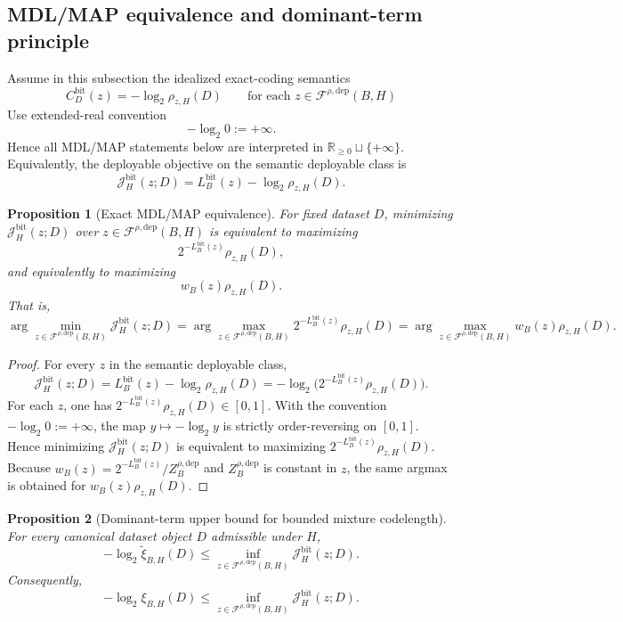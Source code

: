 \documentclass[11pt]{article}
\newtheorem{proposition}{Proposition}
\begin{document}
\subsection{MDL/MAP equivalence and dominant-term principle}

Assume in this subsection the idealized exact-coding semantics
\[
C_D^{\mathrm{bit}}(z) = -\log_2 \rho_{z,H}(D)
\qquad
\text{for each } z\in\mathcal{F}^{\rho,\mathrm{dep}}(B,H)
\]
Use extended-real convention
\[
-\log_2 0 := +\infty.
\]
Hence all MDL/MAP statements below are interpreted in
$\mathbb{R}_{\ge 0}\sqcup\{+\infty\}$.
Equivalently, the deployable objective on the semantic deployable class is
\[
\mathcal{J}_H^{\mathrm{bit}}(z;D)=L_B^{\mathrm{bit}}(z)-\log_2 \rho_{z,H}(D).
\]

\begin{proposition}[Exact MDL/MAP equivalence]
\label{prop:mdl-map}
For fixed dataset $D$, minimizing $\mathcal{J}_H^{\mathrm{bit}}(z;D)$ over
$z\in\mathcal{F}^{\rho,\mathrm{dep}}(B,H)$ is equivalent to maximizing
\[
2^{-L_B^{\mathrm{bit}}(z)}\rho_{z,H}(D),
\]
and equivalently to maximizing
\[
w_B(z)\rho_{z,H}(D).
\]
That is,
\[
\arg\min_{z\in\mathcal{F}^{\rho,\mathrm{dep}}(B,H)}\mathcal{J}_H^{\mathrm{bit}}(z;D)
=
\arg\max_{z\in\mathcal{F}^{\rho,\mathrm{dep}}(B,H)}
2^{-L_B^{\mathrm{bit}}(z)}\rho_{z,H}(D)
=
\arg\max_{z\in\mathcal{F}^{\rho,\mathrm{dep}}(B,H)}
w_B(z)\rho_{z,H}(D).
\]
\end{proposition}

\begin{proof}
For every $z$ in the semantic deployable class,
\[
\mathcal{J}_H^{\mathrm{bit}}(z;D)
=
L_B^{\mathrm{bit}}(z)-\log_2\rho_{z,H}(D)
=
-\log_2\!\bigl(2^{-L_B^{\mathrm{bit}}(z)}\rho_{z,H}(D)\bigr).
\]
For each $z$, one has
$2^{-L_B^{\mathrm{bit}}(z)}\rho_{z,H}(D)\in[0,1]$. With the convention
$-\log_2 0:=+\infty$, the map $y\mapsto -\log_2 y$ is strictly
order-reversing on $[0,1]$. Hence minimizing
$\mathcal{J}_H^{\mathrm{bit}}(z;D)$ is equivalent to maximizing
$2^{-L_B^{\mathrm{bit}}(z)}\rho_{z,H}(D)$.
Because $w_B(z)=2^{-L_B^{\mathrm{bit}}(z)}/Z_B^{\rho,\mathrm{dep}}$ and
$Z_B^{\rho,\mathrm{dep}}$ is constant in $z$, the same argmax is obtained for
$w_B(z)\rho_{z,H}(D)$.
\end{proof}

\begin{proposition}[Dominant-term upper bound for bounded mixture codelength]
\label{prop:dominant-term}
For every canonical dataset object $D$ admissible under $H$,
\[
-\log_2 \widetilde{\xi}_{B,H}(D)
\le
\inf_{z\in\mathcal{F}^{\rho,\mathrm{dep}}(B,H)} \mathcal{J}_H^{\mathrm{bit}}(z;D).
\]
Consequently,
\[
-\log_2 \xi_{B,H}(D)
\le
\inf_{z\in\mathcal{F}^{\rho,\mathrm{dep}}(B,H)} \mathcal{J}_H^{\mathrm{bit}}(z;D).
\]
\end{proposition}
\end{document}
